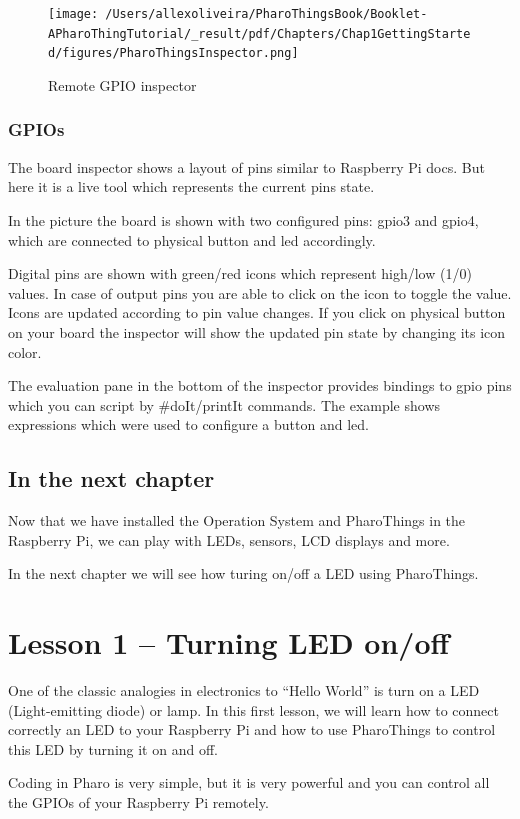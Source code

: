 \documentclass[10pt,twoside,english]{_support/latex/sbabook/sbabook}
\begin{document}
\begin{figure}

\begin{center}
\texttt{[image: /Users/allexoliveira/PharoThingsBook/Booklet-APharoThingTutorial/\_result/pdf/Chapters/Chap1GettingStarted/figures/PharoThingsInspector.png]}\caption{Remote GPIO inspector\label{PharoThingsinspector}}\end{center}
\end{figure}

\subsection{GPIOs}
The board inspector shows a layout of pins similar to Raspberry Pi docs. But here it is a live tool which represents the current pins state.

In the picture the board is shown with two configured pins: gpio3 and gpio4, which are connected to physical button and led accordingly.

Digital pins are shown with green/red icons which represent high/low (1/0) values. In case of output pins you are able to click on the icon to toggle the value. Icons are updated according to pin value changes. If you click on physical button on your board the inspector will show the updated pin state by changing its icon color.

The evaluation pane in the bottom of the inspector provides bindings to gpio pins which you can script by \#doIt/printIt commands. The example shows expressions which were used to configure a button and led.
\section{In the next chapter}
Now that we have installed the Operation System and PharoThings in the Raspberry Pi, we can play with LEDs, sensors, LCD displays and more. 

In the next chapter we will see how turing on/off a LED using PharoThings. 
\chapter{Lesson 1 – Turning LED on/off}
One of the classic analogies in electronics to “Hello World” is turn on a LED (Light-emitting diode) or lamp. In this first lesson, we will learn how to connect correctly an LED to your Raspberry Pi and how to use PharoThings to control this LED by turning it on and off.

Coding in Pharo is very simple, but it is very powerful and you can control all the GPIOs of your Raspberry Pi remotely.
\end{document}
